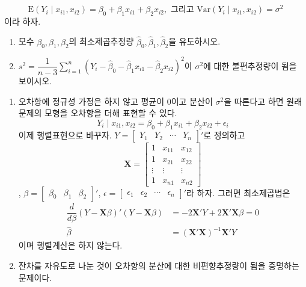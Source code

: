 \documentclass[answers]{exam}
\begin{document}
\begin{questions}
   $$
    \mathrm{E}\left(Y_{i}\;|\;x_{i1},x_{i2}\right)=\beta_{0}+\beta_{1}x_{i1}+\beta_{2}x_{i2},\text{ 그리고 } \mathrm{Var}\left(Y_{i}\;|\;x_{i1},x_{i2}\right)=\sigma^{2}
   $$
   이라 하자.
   \begin{enumerate}
    \item 모수 $\beta_{0}, \beta_{1},\beta_{2}$의 최소제곱추정량 $\widehat{\beta}_{0},\widehat{\beta}_{1},\widehat{\beta}_{2}$을 유도하시오.
    \item $s^{2}=\dfrac{1}{n-3}\displaystyle\sum_{i=1}^{n}\left(Y_{i}-\widehat{\beta}_{0}-\widehat{\beta}_{1}x_{i1}-\widehat{\beta}_{2}x_{i2}\right)^{2}$이 $\sigma^{2}$에 대한 불편추정량이 됨을 보이시오.
   \end{enumerate}
   \begin{solution}
    \begin{enumerate}
      \item 오차항에 정규성 가정은 하지 않고 평균이 $0$이고 분산이 $\sigma^{2}$을 따른다고 하면 원래 문제의 모형을 오차항을 더해 표현할 수 있다.
      $$
        Y_{i}\;|\;x_{i1},x_{i2}= \beta_{0}+\beta_{1}x_{i1}+\beta_{2}x_{i2}+\epsilon_{i}
      $$
      이제 행렬표현으로 바꾸자. $Y=\begin{bmatrix}Y_{1} & Y_{2} & \cdots & Y_{n} \end{bmatrix}'$로 정의하고
      $$
        \mathbf{X}= \begin{bmatrix}1 & x_{11} & x_{12}\\ 1& x_{21} & x_{22}\\ \vdots & \vdots & \vdots \\ 1 & x_{n1} & x_{n2}  \end{bmatrix}
      $$
      , $\beta=\begin{bmatrix}\beta_{0} & \beta_{1} & \beta_{2}\end{bmatrix}'$, $\epsilon=\begin{bmatrix}\epsilon_{1} & \epsilon_{2} & \cdots & \epsilon_{n}\end{bmatrix}'$라 하자. 그러면 최소제곱법은
      \begin{align}
        \dfrac{d}{d\beta}\left(Y-\mathbf{X}\beta\right)'\left(Y-\mathbf{X}\beta\right)&= -2\mathbf{X}'Y+2\mathbf{X}'\mathbf{X}\beta=0 \\
        \widehat{\beta} &= \left(\mathbf{X}'\mathbf{X}\right)^{-1}\mathbf{X}'Y
      \end{align}
      이며 행렬계산은 하지 않는다.
      \item 잔차를 자유도로 나눈 것이 오차항의 분산에 대한 비편향추정량이 됨을 증명하는 문제이다.

\end{enumerate}
\end{solution}
\end{questions}
\end{document}
